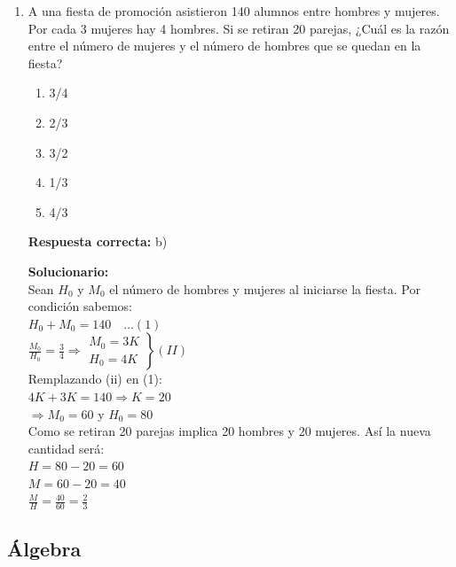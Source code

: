 \begin{enumerate}
	\item A una fiesta de promoción asistieron 140 alumnos entre hombres y mujeres. Por cada 3 mujeres hay 4 hombres. Si se retiran 20 parejas, ¿Cuál es la razón entre el número de mujeres y el número de hombres que se quedan en la fiesta?
	\begin{enumerate}[label=\alph*)]
		\item 3/4
		\item 2/3
		\item 3/2
		\item 1/3
		\item 4/3
	\end{enumerate}
	\textbf{Respuesta correcta:} b)
	
	\vspace{2mm}
	\textbf{Solucionario:}\\
	Sean $H_0$ y $M_0$ el número de hombres y mujeres al iniciarse la fiesta. Por condición sabemos:\\
	$H_0 + M_0 = 140 \quad \dots (1)$\\
	$\frac{M_0}{H_0} = \frac{3}{4} \Rightarrow \left. \begin{array}{l} M_0 = 3K \\ H_0 = 4K \end{array} \right\} (II)$\\
	Remplazando (ii) en (1):\\
	$4K + 3K = 140 \Rightarrow K = 20$\\
	$\Rightarrow M_0 = 60$ y $H_0 = 80$\\
	Como se retiran 20 parejas implica 20 hombres y 20 mujeres. Así la nueva cantidad será:\\
	$H = 80 - 20 = 60$\\
	$M = 60 - 20 = 40$\\
	$\frac{M}{H} = \frac{40}{60} = \frac{2}{3} $
	
	
	\vspace{6mm}
	
\end{enumerate}


\subsection*{Álgebra}

